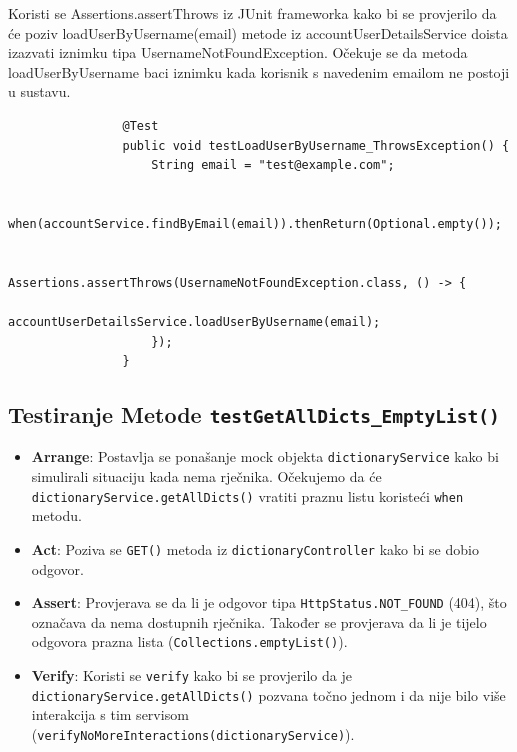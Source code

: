 			Koristi se Assertions.assertThrows iz JUnit frameworka kako bi se provjerilo da će poziv loadUserByUsername(email) metode iz accountUserDetailsService doista izazvati iznimku tipa UsernameNotFoundException. Očekuje se da metoda loadUserByUsername baci iznimku kada korisnik s navedenim emailom ne postoji u sustavu.
			
			\begin{lstlisting}
				@Test
				public void testLoadUserByUsername_ThrowsException() {
					String email = "test@example.com";
					
					when(accountService.findByEmail(email)).thenReturn(Optional.empty());
					
					Assertions.assertThrows(UsernameNotFoundException.class, () -> {
						accountUserDetailsService.loadUserByUsername(email);
					});
				}
			\end{lstlisting}
			
			\subsection{Testiranje Metode \texttt{testGetAllDicts_EmptyList()}}	
			
			\begin{itemize}
				\item \textbf{Arrange}: Postavlja se ponašanje mock objekta \texttt{dictionaryService} kako bi simulirali situaciju kada nema rječnika. Očekujemo da će \texttt{dictionaryService.getAllDicts()} vratiti praznu listu koristeći \texttt{when} metodu.
				
				\item \textbf{Act}: Poziva se \texttt{GET()} metoda iz \texttt{dictionaryController} kako bi se dobio odgovor.
				
				\item \textbf{Assert}: Provjerava se da li je odgovor tipa \texttt{HttpStatus.NOT\_FOUND} (404), što označava da nema dostupnih rječnika. Također se provjerava da li je tijelo odgovora prazna lista (\texttt{Collections.emptyList()}).
				
				\item \textbf{Verify}: Koristi se \texttt{verify} kako bi se provjerilo da je \texttt{dictionaryService.getAllDicts()} pozvana točno jednom i da nije bilo više interakcija s tim servisom (\texttt{verifyNoMoreInteractions(dictionaryService)}).
			\end{itemize}
			
